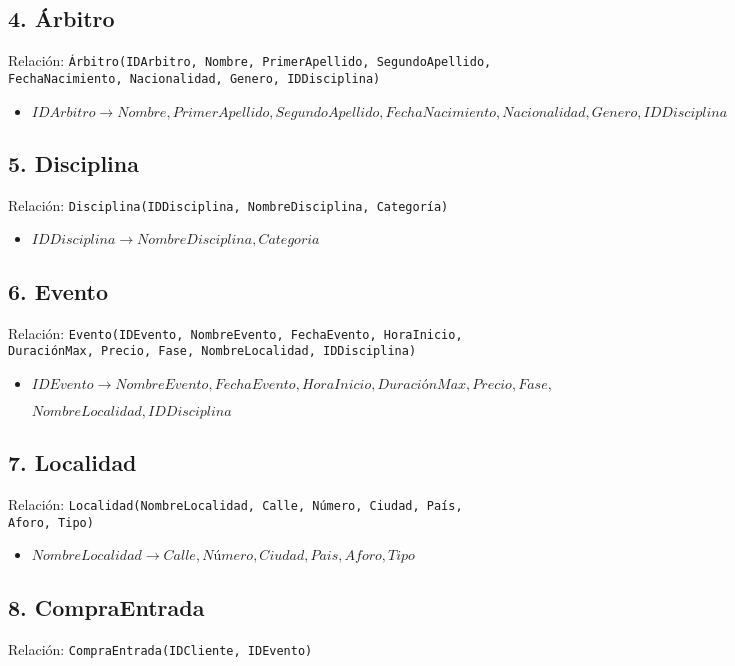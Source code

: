 \subsection*{4. Árbitro}
Relación: \texttt{Árbitro(IDArbitro, Nombre, PrimerApellido, SegundoApellido, FechaNacimiento, Nacionalidad, Genero, IDDisciplina)}

\begin{itemize}
    \item $IDArbitro \rightarrow Nombre, PrimerApellido, SegundoApellido, FechaNacimiento, Nacionalidad, Genero, IDDisciplina$
\end{itemize}

\subsection*{5. Disciplina}
Relación: \texttt{Disciplina(IDDisciplina, NombreDisciplina, Categoría)}

\begin{itemize}
    \item $IDDisciplina \rightarrow NombreDisciplina, Categoria$
\end{itemize}

\subsection*{6. Evento}
Relación: \texttt{Evento(IDEvento, NombreEvento, FechaEvento, HoraInicio, DuraciónMax, Precio, Fase, NombreLocalidad, IDDisciplina)}

\begin{itemize}
    \item $IDEvento \rightarrow NombreEvento, FechaEvento, HoraInicio, DuraciónMax, Precio, Fase, $

$NombreLocalidad, IDDisciplina$
\end{itemize}

\subsection*{7. Localidad}
Relación: \texttt{Localidad(NombreLocalidad, Calle, Número, Ciudad, País, Aforo, Tipo)}

\begin{itemize}
    \item $NombreLocalidad \rightarrow Calle, Número, Ciudad, Pais, Aforo, Tipo$
\end{itemize}


\subsection*{8. CompraEntrada}
Relación: \texttt{CompraEntrada(IDCliente, IDEvento)}

